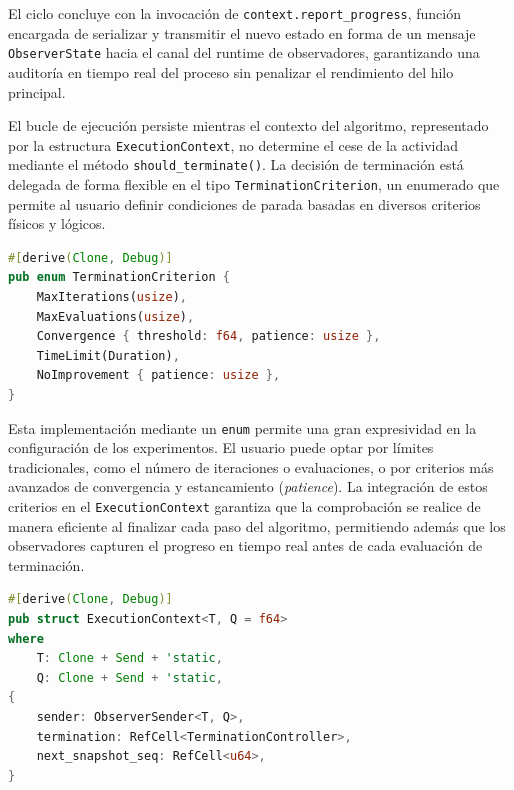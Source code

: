\documentclass[12pt,a4paper,twoside,openright]{book}
\begin{document}
        El ciclo concluye con la invocación de \texttt{context.report\_progress}, función encargada de serializar y transmitir el nuevo estado en forma de un mensaje \texttt{ObserverState} hacia el canal del runtime de observadores, garantizando una auditoría en tiempo real del proceso sin penalizar el rendimiento del hilo principal.

        El bucle de ejecución persiste mientras el contexto del algoritmo, representado por la estructura \texttt{ExecutionContext}, no determine el cese de la actividad mediante el método \texttt{should\_terminate()}. La decisión de terminación está delegada de forma flexible en el tipo \texttt{TerminationCriterion}, un enumerado que permite al usuario definir condiciones de parada basadas en diversos criterios físicos y lógicos.

    \noindent
    \begin{samepage}
    \begin{lstlisting}[language=Rust, caption={Enumerado \texttt{TerminationCriterion} con las condiciones de parada disponibles.}, label={lst:termination_enum}]
#[derive(Clone, Debug)]
pub enum TerminationCriterion {
    MaxIterations(usize),
    MaxEvaluations(usize),
    Convergence { threshold: f64, patience: usize },
    TimeLimit(Duration),
    NoImprovement { patience: usize },
}
    \end{lstlisting}
    \end{samepage}
        
        Esta implementación mediante un \texttt{enum} permite una gran expresividad en la configuración de los experimentos. El usuario puede optar por límites tradicionales, como el número de iteraciones o evaluaciones, o por criterios más avanzados de convergencia y estancamiento (\emph{patience}). La integración de estos criterios en el \texttt{ExecutionContext} garantiza que la comprobación se realice de manera eficiente al finalizar cada paso del algoritmo, permitiendo además que los observadores capturen el progreso en tiempo real antes de cada evaluación de terminación.

    \noindent
    \begin{samepage}
    \begin{lstlisting}[language=Rust, caption={Estructura \texttt{ExecutionContext} encargada de la gestión del entorno y el control del ciclo de vida del algoritmo.}, label={lst:execution_context}]
#[derive(Clone, Debug)]
pub struct ExecutionContext<T, Q = f64>
where
    T: Clone + Send + 'static,
    Q: Clone + Send + 'static,
{
    sender: ObserverSender<T, Q>,
    termination: RefCell<TerminationController>,
    next_snapshot_seq: RefCell<u64>,
}
    \end{lstlisting}
    \end{samepage}
\end{document}
